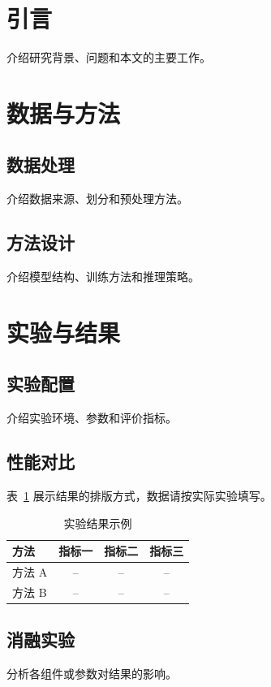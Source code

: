 \documentclass{sdxxpaper}
\begin{document}
\makecover
\cqutBeginReportBody
\makepaperheading


\section{引言}
介绍研究背景、问题和本文的主要工作。

\section{数据与方法}
\subsection{数据处理}
介绍数据来源、划分和预处理方法。

\subsection{方法设计}
介绍模型结构、训练方法和推理策略。

\section{实验与结果}
\subsection{实验配置}
介绍实验环境、参数和评价指标。

\subsection{性能对比}
表~\ref{tab:results} 展示结果的排版方式，数据请按实际实验填写。
\begin{table}[htbp]
  \centering
  \caption{实验结果示例}
  \label{tab:results}
  \begin{tabular}{lccc}
    \toprule
    方法 & 指标一 & 指标二 & 指标三 \\
    \midrule
    方法 A & -- & -- & -- \\
    方法 B & -- & -- & -- \\
    \bottomrule
  \end{tabular}
\end{table}

\subsection{消融实验}
分析各组件或参数对结果的影响。
\end{document}
